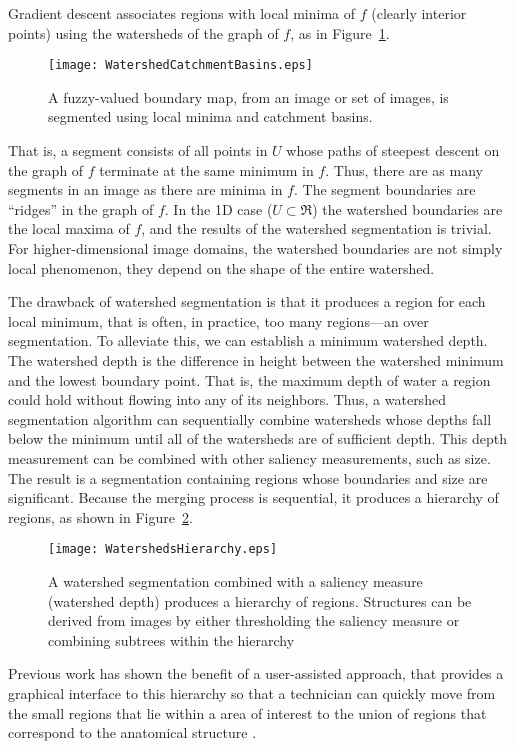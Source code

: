 Gradient descent associates regions with local minima of $f$ (clearly interior
points) using the watersheds of the graph of $f$, as in
Figure~\ref{fig:segment}.
\begin{figure}
\centering
\texttt{[image: WatershedCatchmentBasins.eps]}
\caption[Watershed Catchment Basins]{A fuzzy-valued boundary map, from an image
  or set of images, is segmented using local minima and catchment basins.}
\protect\label{fig:segment}
\end{figure}
That is, a segment consists of all points in $U$ whose paths of steepest
descent on the graph of $f$ terminate at the same minimum in $f$.  Thus, there
are as many segments in an image as there are minima in $f$.  The segment
boundaries are ``ridges'' \cite{Koenderink1979,Koenderink1993,Eberly1996} in
the graph of $f$.  In the 1D case ($U \subset \Re$) the watershed boundaries
are the local maxima of $f$, and the results of the watershed segmentation is
trivial.  For higher-dimensional image domains, the watershed boundaries are
not simply local phenomenon, they depend on the shape of the entire watershed.

The drawback of watershed segmentation is that it produces a region for each
local minimum, that is often, in practice, too many regions---an over
segmentation.  To alleviate this, we can establish a minimum watershed depth.
The watershed depth is the difference in height between the watershed minimum
and the lowest boundary point.  That is, the maximum depth of water a region
could hold without flowing into any of its neighbors.  Thus, a watershed
segmentation algorithm can sequentially combine watersheds whose depths fall
below the minimum until all of the watersheds are of sufficient depth.  This
depth measurement can be combined with other saliency measurements, such as
size.  The result is a segmentation containing regions whose boundaries and
size are significant.  Because the merging process is sequential, it produces a
hierarchy of regions, as shown in Figure~\ref{fig:watersheds}.
\begin{figure}
\centering
\texttt{[image: WatershedsHierarchy.eps]}
\caption[Watersheds Hierarchy of Regions]{A watershed segmentation combined
with a saliency measure (watershed depth) produces a hierarchy of regions.
Structures can be derived from images by either thresholding the saliency
measure or combining subtrees within the hierarchy}
\protect\label{fig:watersheds}
\end{figure}
Previous work has shown the benefit of a user-assisted approach, that provides
a graphical interface to this hierarchy so that a technician can quickly move
from the small regions that lie within a area of interest to the union of
regions that correspond to the anatomical structure \cite{Yoo1991}.

